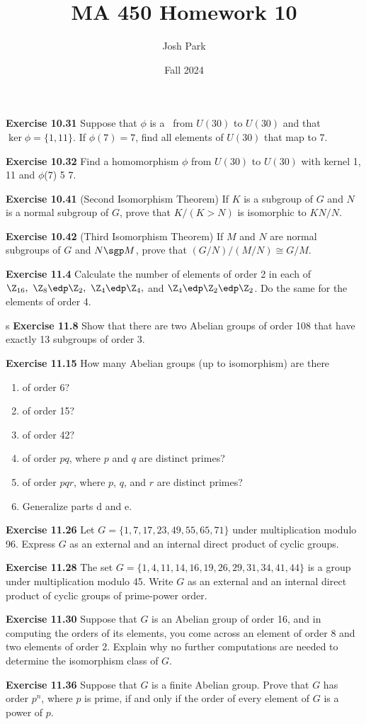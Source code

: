 \documentclass{article}
\author{Josh Park}
\date{\vspace*{-1em}Fall 2024}
\title{\vspace*{-2em}MA 450 Homework 10\vspace*{-1em}}
\begin{document}
\maketitle
\textbf{Exercise 10.31} Suppose that \(\phi\) is a \homo\ from \(U(30)\) to \(U(30)\) and that \(\ker\phi = \{1,11\}\). If \(\phi(7) = 7\), find all elements of \(U(30)\) that map to 7.


\textbf{Exercise 10.32} Find a homomorphism \(\phi\) from $U(30)$ to $U(30)$ with kernel {1, 11} and $\phi$(7) 5 7.


\textbf{Exercise 10.41} (Second Isomorphism Theorem) If $K$ is a subgroup of $G$ and $N$ is a normal subgroup of $G$, prove that $K/(K > N)$ is isomorphic to $KN/N$.


\textbf{Exercise 10.42} (Third Isomorphism Theorem) If $M$ and $N$ are normal subgroups of $G$ and $N \sgp M$, prove that $(G/N)/(M/N) \cong G/M$.


\textbf{Exercise 11.4} Calculate the number of elements of order 2 in each of $\Z_{16},\ \Z_{8} \edp \Z_{2},\ \Z_{4} \edp \Z_{4},$ and $\Z_{4} \edp \Z_{2} \edp \Z_{2}$. Do the same for the elements of order 4.

s
\textbf{Exercise 11.8} Show that there are two Abelian groups of order 108 that have exactly 13 subgroups of order 3.


\textbf{Exercise 11.15} How many Abelian groups (up to isomorphism) are there
\begin{enumerate}[label=\textbf{\alph*.}]
  \item of order 6?
  \item of order 15?
  \item of order 42?
  \item of order \(pq\), where \(p\) and \(q\) are distinct primes?
  \item of order $pqr$, where $p$, $q$, and $r$ are distinct primes?
  \item Generalize parts d and e.
\end{enumerate}


\textbf{Exercise 11.26} Let $G = \{1, 7, 17, 23, 49, 55, 65, 71\}$ under multiplication modulo 96. Express $G$ as an external and an internal direct product of cyclic groups.


\textbf{Exercise 11.28} The set $G = \{1, 4, 11, 14, 16, 19, 26, 29, 31, 34, 41, 44\}$ is a group under multiplication modulo 45. Write $G$ as an external and an internal direct product of cyclic groups of prime-power order.


\textbf{Exercise 11.30} Suppose that $G$ is an Abelian group of order 16, and in computing the orders of its elements, you come across an element of order 8 and two elements of order 2. Explain why no further computations are needed to determine the isomorphism class of $G$.


\textbf{Exercise 11.36} Suppose that $G$ is a finite Abelian group. Prove that $G$ has order $p^n$, where $p$ is prime, if and only if the order of every element of $G$ is a power of $p$.
\end{document}
